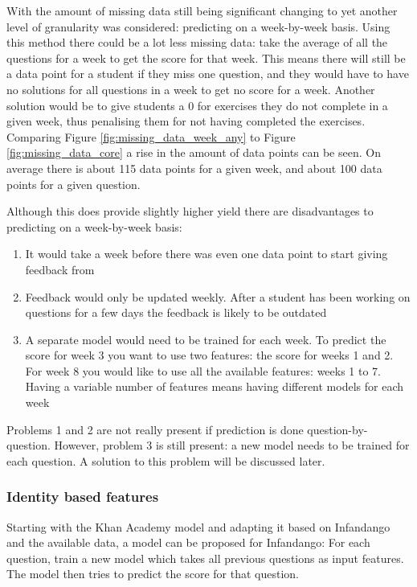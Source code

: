 With the amount of missing data still being significant changing to yet another level of granularity was considered: predicting on a week-by-week basis. Using this method there could be a lot less missing data: take the average of all the questions for a week to get the score for that week. This means there will still be a data point for a student if they miss one question, and they would have to have no solutions for all questions in a week to get no score for a week. Another solution would be to give students a 0 for exercises they do not complete in a given week, thus penalising them for not having completed the exercises. Comparing Figure \ref{fig:missing_data_week_any} to Figure \ref{fig:missing_data_core} a rise in the amount of data points can be seen. On average there is about 115 data points for a given week, and about 100 data points for a given question.

Although this does provide slightly higher yield there are disadvantages to predicting on a week-by-week basis:

\begin{enumerate}
\item It would take a week before there was even one data point to start giving feedback from
\item Feedback would only be updated weekly. After a student has been working on questions for a few days the feedback is likely to be outdated
\item A separate model would need to be trained for each week. To predict the score for week 3 you want to use two features: the score for weeks 1 and 2. For week 8 you would like to use all the available features: weeks 1 to 7. Having a variable number of features means having different models for each week
\end{enumerate}

Problems 1 and 2 are not really present if prediction is done question-by-question. However, problem 3 is still present: a new model needs to be trained for each question. A solution to this problem will be discussed later.

\subsubsection{Identity based features}
Starting with the Khan Academy model and adapting it based on Infandango and the available data, a model can be proposed for Infandango: For each question, train a new model which takes all previous questions as input features. The model then tries to predict the score for that question.

